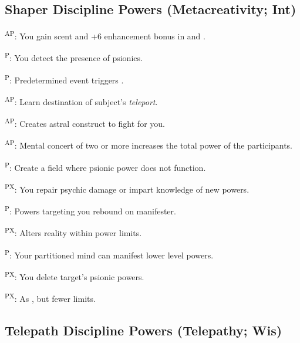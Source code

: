 \subsection{Shaper Discipline Powers {\normalsize(Metacreativity; Int)}}
\begin{enumerate*}
\item {}\textsuperscript{AP}: You gain scent and +6 enhancement bonus in  and .

\item {}\textsuperscript{P}: You detect the presence of psionics.

      \textsuperscript{P}: Predetermined event triggers .

\item {}\textsuperscript{AP}: Learn destination of subject's \emph{teleport}.

\item
\item {}\textsuperscript{AP}: Creates astral construct to fight for you.

      \textsuperscript{AP}: Mental concert of two or more increases the total power of the participants.

\item {}\textsuperscript{P}: Create a field where psionic power does not function.
\item {}\textsuperscript{PX}: You repair psychic damage or impart knowledge of new powers.

      \textsuperscript{P}: Powers targeting you rebound on manifester.

\item {}\textsuperscript{PX}: Alters reality within power limits.

      \textsuperscript{P}: Your partitioned mind can manifest lower level powers.

\item {}\textsuperscript{PX}: You delete target's psionic powers.

      \textsuperscript{PX}: As , but fewer limits.
\end{enumerate*}



\subsection{Telepath Discipline Powers {\normalsize(Telepathy; Wis)}}
\begin{enumerate*}
\item
\item
\item
\item
\item
\item
\item
\item
\item
\end{enumerate*}